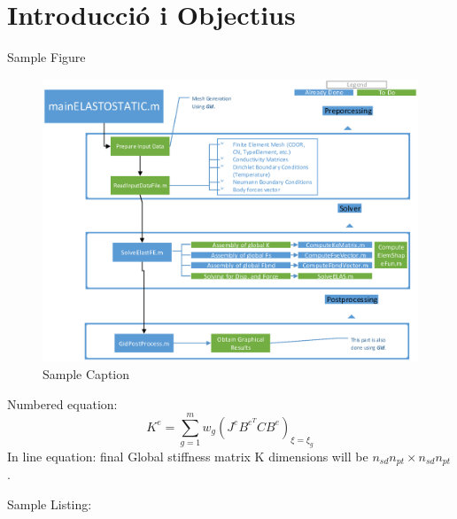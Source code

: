 \section{Introducció i Objectius}
Sample Figure
\begin{figure}[H]
	\centering
	\includegraphics[scale=0.9]{./pics/sample}
	\caption{Sample Caption}
\end{figure}
Numbered equation:
\begin{equation}
	K^e = \sum_{g=1}^{m}w_g (J^eB^{e^T}C B^e)_{\xi=\xi_g}
\end{equation}
In line equation:
final Global stiffness matrix K dimensions will be $n_{sd}n_{pt}\times n_{sd}n_{pt}$.

Sample Listing:
